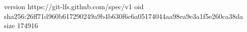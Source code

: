 version https://git-lfs.github.com/spec/v1
oid sha256:26ff71d960b617290249a9b4b630f6c6a05174044aa98ea9e3a1f5e260ca38da
size 174916

